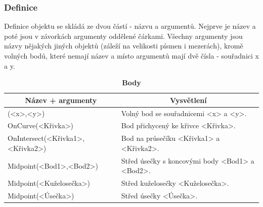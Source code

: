 \documentclass[11pt]{article}
\begin{document}
    \subsubsection{Definice}
    Definice objektu se skládá ze dvou částí - názvu a argumentů. Nejprve je název a poté jsou v závorkách argumenty oddělené čárkami. Všechny argumenty jsou názvy nějakých jiných objektů (záleží na velikosti písmen i mezerách), kromě volných bodů, které nemají název a místo argumentů mají dvě čísla - souřadnici x a y.
    \begin{table}[!htb]
    \begin{center}
        \caption{\bf Body}
        \begin{tabularx}{\linewidth}{|l|X|}
            \hline 
            \multicolumn{1}{|c|}{\textbf{Název + argumenty}} & \multicolumn{1}{c|}{\textbf{Vysvětlení}}\\
            \hline

            (<x>,<y>) & Volný bod se souřadnicemi <x> a <y>. \\
            \hline
            OnCurve(<Křivka>) & Bod přichycený ke křivce <Křivka>. \\
            \hline
            OnIntersect(<Křivka1>,<Křivka2>) & Bod na průsečíku <Křivka1> a <Křivka2>. \\
            \hline
            Midpoint(<Bod1>,<Bod2>) & Střed úsečky s koncovými body <Bod1> a <Bod2>. \\
            \hline
            Midpoint(<Kuželosečka>) & Střed kuželosečky <Kuželosečka>. \\
            \hline
            Midpoint(<Úsečka>) & Střed úsečky <Úsečka>. \\
            \hline
        \end{tabularx}
    \end{center}
    \end{table}
\end{document}
